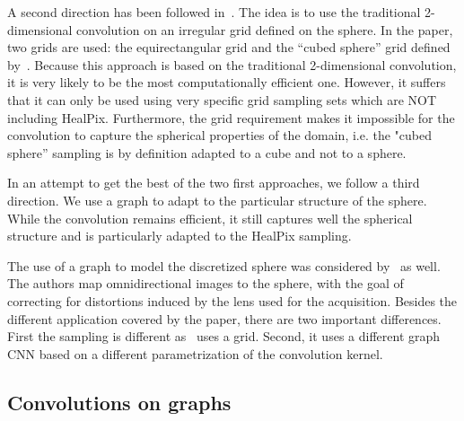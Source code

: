 \documentclass[final,twocolumn,3p,times,authoryear]{elsarticle}
\newcommand{\nati}[1]{{\color[rgb]{.1,.6,.1}{#1}}}
\newcommand{\todo}[1]{{\color[rgb]{.6,.1,.6}{#1}}}
\newcommand{\1}{\b{1}}              %
\newcommand{\0}{\b{0}}              %
\begin{document}
A second direction has been followed in~\citet{boomsma2017spherical}. The idea is
to use the traditional 2-dimensional convolution on an irregular grid defined on the
sphere. In the paper, two grids are used: the equirectangular grid and the ``cubed
sphere'' grid defined by~\citet{ronchi1996cubed}. \nati{Do we need a plot of the equirectangular and cubed sphere sampling?} Because this
approach is based on the traditional 2-dimensional convolution, it is very likely to be the
most computationally efficient one. However, it suffers that it can only be used using very
specific grid sampling sets which are NOT including HealPix. Furthermore, the
grid requirement makes it impossible for the convolution to capture the
spherical properties of the domain, i.e. the "cubed sphere” sampling is by
definition adapted to a cube and not to a sphere.
\todo{border effects? \nati{@mdeff what are you thinking about here?}}

In an attempt to get the best of the two first approaches, we follow a third
direction. We use a graph to adapt to the particular structure of the sphere.
While the convolution remains efficient, it still captures well the spherical
structure and is particularly adapted to the HealPix sampling.

The use of a graph to model the discretized sphere was considered by~\citet{khasanova2017graph} as well. The authors map omnidirectional images to the sphere, with the goal of correcting for distortions induced by the lens used for the acquisition.
Besides the different application covered by the paper, there are two important
differences. First the sampling is different as~\cite{khasanova2017graph} uses a
grid. Second, it uses a different graph CNN based on a different parametrization
of the convolution kernel.


\subsection{Convolutions on graphs}
\todo{Maybe we just describe convolutions on sphere and graph, i.e: do we really need all these three subsections? Maybe simply merge them?}

\nati{I think that citing Bruna is to much... According to me, the goal of this subsection should not be to cite everything that exist. But should focus on
1) be fair and say that they are other graph convolutions that can be used, 2) show some connections between graph CNNs ang group equivariant CNNs (Done), and 3) suggest that they are possible extensions of what we do.}
\end{document}
